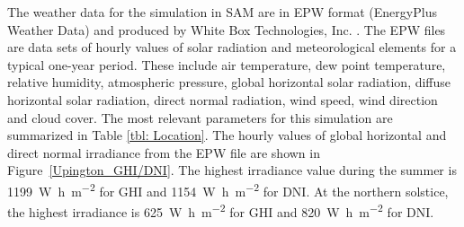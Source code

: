 The weather data for the simulation in SAM are in EPW format (EnergyPlus Weather Data) and produced by White Box Technologies, Inc. \cite{WhiteBoxTechnologies2015}. The EPW files are data sets of hourly values of solar radiation and meteorological elements for a typical one-year period. These include air temperature, dew point temperature, relative humidity, atmospheric pressure, global horizontal solar radiation, diffuse horizontal solar radiation, direct normal radiation, wind speed, wind direction and cloud cover. The most relevant parameters for this simulation are summarized in Table \ref{tbl: Location}. The hourly values of global horizontal and direct normal irradiance from the EPW file are shown in Figure~\ref{Upington_GHI/DNI}. The highest irradiance value during the summer is \SI{1199}{\watt\hour\per\square\metre} for GHI and \SI{1154}{\watt\hour\per\square\metre} for DNI. At the northern solstice, the highest irradiance is \SI{625}{\watt\hour\per\square\metre} for GHI and \SI{820}{\watt\hour\per\square\metre} for DNI.


